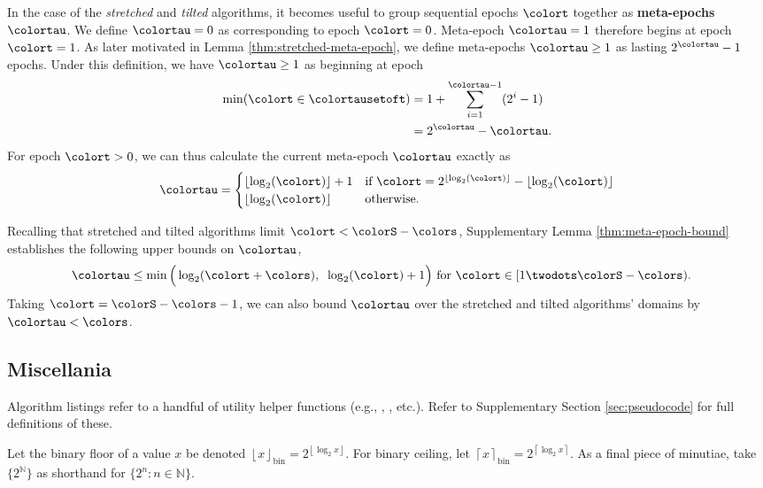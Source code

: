 In the case of the \textit{stretched} and \textit{tilted} algorithms, it becomes useful to group sequential epochs $\colort$ together as \textbf{meta-epochs} $\colortau$.
We define $\colortau=0$ as corresponding to epoch $\colort=0$.
Meta-epoch $\colortau=1$ therefore begins at epoch $\colort = 1$.
As later motivated in Lemma \ref{thm:stretched-meta-epoch}, we define meta-epochs $\colortau\geq1$ as lasting $2^{\colortau} - 1$ epochs.
Under this definition, we have $\colortau\geq1$ as beginning at epoch
\begin{align}
\min(\colort \in \colortausetoft)
&= 1 + \sum_{i=1}^{\colortau - 1} (2^{i} - 1) \nonumber \\
&= 2^{\colortau} - \colortau.
\label{eqn:meta-epoch-defn}
\end{align}
For epoch $\colort > 0$, we can thus calculate the current meta-epoch $\colortau$ exactly as
\begin{align*}
\colortau
=
\begin{cases}
\left\lfloor \log_2(\colort) \right\rfloor + 1 & \text{if } \colort = 2^{\left\lfloor \log_2(\colort) \right\rfloor} - \left\lfloor \log_2(\colort) \right\rfloor \\
\left\lfloor \log_2(\colort) \right\rfloor & \text{otherwise.}
\end{cases}
\end{align*}

Recalling that stretched and tilted algorithms limit $\colort < \colorS - \colors$, Supplementary Lemma \ref{thm:meta-epoch-bound} establishes the following upper bounds on $\colortau$,
\begin{align*}
\colortau
&\leq
\min\Big(
  \log_2(\colort + \colors),\;\;
  \log_2(\colort) + 1
\Big)
\text{ for } \colort \in [1 \twodots \colorS - \colors).
\end{align*}
Taking $\colort = \colorS - \colors - 1$, we can also bound $\colortau$ over the stretched and tilted algorithms' domains by $\colortau < \colors$.

\subsection{Miscellania}

Algorithm listings refer to a handful of utility helper functions (e.g., , , etc.).
Refer to Supplementary Section \ref{sec:pseudocode} for full definitions of these.

Let the binary floor of a value $x$ be denoted $\left\lfloor x \right\rfloor_\mathrm{bin} = 2^{\left\lfloor \log_2 x \right\rfloor}$.
For binary ceiling, let $\left\lceil x \right\rceil_\mathrm{bin} = 2^{\left\lceil \log_2 x \right\rceil}$.
As a final piece of minutiae, take $\{2^{\mathbb{N}}\}$ as shorthand for $\{2^n : n \in \mathbb{N} \}$.
